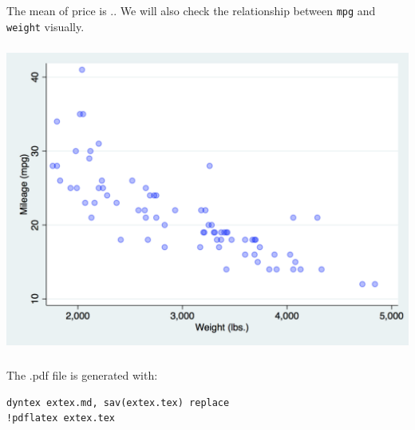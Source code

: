 \documentclass[11pt]{article}
\begin{document}
The mean of price is         .. We will also check the 
relationship between \texttt{mpg} and \texttt{weight} visually. 


\begin{center}
\begin{centering}
\includegraphics[height=4in]{graph.png}
\end{centering}
\end{center}

The .pdf file is generated with:

\begin{lstlisting}[frame=single]
dyntex extex.md, sav(extex.tex) replace
!pdflatex extex.tex
\end{lstlisting}
\end{document}
